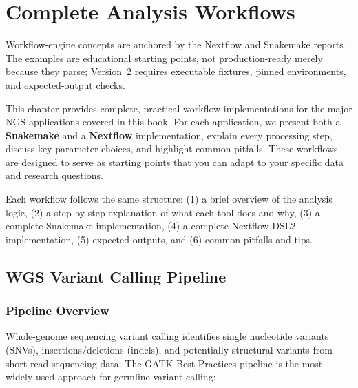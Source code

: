 \chapter{Complete Analysis Workflows}
\label{ch:workflows}

\begin{sourcebox}
Workflow-engine concepts are anchored by the Nextflow and Snakemake reports \cite{diTommaso2017,molder2021}. The examples are educational starting points, not production-ready merely because they parse; Version~2 requires executable fixtures, pinned environments, and expected-output checks.
\end{sourcebox}

\begin{keyconcept}
This chapter provides complete, practical workflow implementations for the major \acrshort{NGS} applications covered in this book. For each application, we present both a \textbf{Snakemake} and a \textbf{Nextflow} implementation, explain every processing step, discuss key parameter choices, and highlight common pitfalls. These workflows are designed to serve as starting points that you can adapt to your specific data and research questions.
\end{keyconcept}

Each workflow follows the same structure: (1) a brief overview of the analysis logic, (2) a step-by-step explanation of what each tool does and why, (3) a complete Snakemake implementation, (4) a complete Nextflow DSL2 implementation, (5) expected outputs, and (6) common pitfalls and tips.

\section{WGS Variant Calling Pipeline}
\label{sec:wf:wgs}

\subsection{Pipeline Overview}

Whole-genome sequencing variant calling identifies single nucleotide variants (SNVs), insertions/deletions (indels), and potentially structural variants from short-read sequencing data. The GATK Best Practices pipeline is the most widely used approach for germline variant calling:

